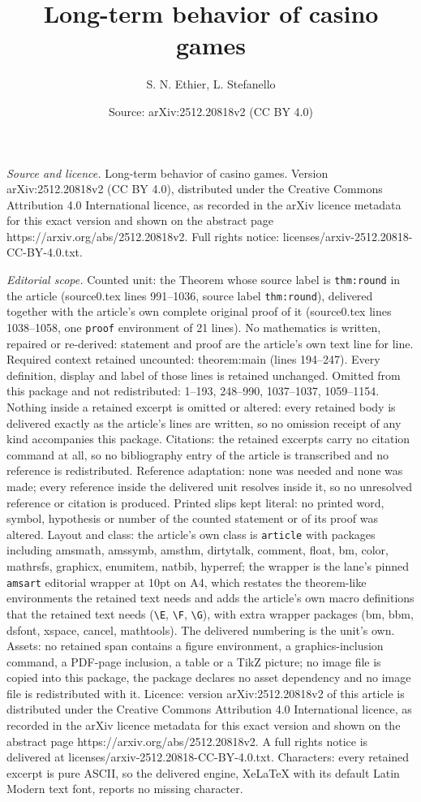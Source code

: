 \documentclass[10pt,a4paper]{amsart}
\title[Long-term behavior of casino games]{Long-term behavior of casino games}
\author{S. N. Ethier, L. Stefanello}
\date{Source: arXiv:2512.20818v2 (CC BY 4.0)}
\begin{document}
\maketitle

\noindent\emph{Source and licence.} Long-term behavior of casino games. Version arXiv:2512.20818v2 (CC BY 4.0), distributed under the Creative Commons Attribution 4.0 International licence, as recorded in the arXiv licence metadata for this exact version and shown on the abstract page https://arxiv.org/abs/2512.20818v2. Full rights notice: licenses/arxiv-2512.20818-CC-BY-4.0.txt.\par\smallskip

\noindent\textit{Editorial scope.} Counted unit: the Theorem whose source label is \texttt{thm:round} in the article (source0.tex lines 991--1036, source label \texttt{thm:round}), delivered together with the article's own complete original proof of it (source0.tex lines 1038--1058, one \texttt{proof} environment of 21 lines). No mathematics is written, repaired or re-derived: statement and proof are the article's own text line for line. Required context retained uncounted: theorem:main (lines 194--247). Every definition, display and label of those lines is retained unchanged. Omitted from this package and not redistributed: 1--193, 248--990, 1037--1037, 1059--1154. Nothing inside a retained excerpt is omitted or altered: every retained body is delivered exactly as the article's lines are written, so no omission receipt of any kind accompanies this package. Citations: the retained excerpts carry no citation command at all, so no bibliography entry of the article is transcribed and no reference is redistributed. Reference adaptation: none was needed and none was made; every reference inside the delivered unit resolves inside it, so no unresolved reference or citation is produced. Printed slips kept literal: no printed word, symbol, hypothesis or number of the counted statement or of its proof was altered. Layout and class: the article's own class is \texttt{article} with packages including amsmath, amssymb, amsthm, dirtytalk, comment, float, bm, color, mathrsfs, graphicx, enumitem, natbib, hyperref; the wrapper is the lane's pinned \texttt{amsart} editorial wrapper at 10pt on A4, which restates the theorem-like environments the retained text needs and adds the article's own macro definitions that the retained text needs (\texttt{\textbackslash E}, \texttt{\textbackslash F}, \texttt{\textbackslash G}), with extra wrapper packages (bm, bbm, dsfont, xspace, cancel, mathtools). The delivered numbering is the unit's own. Assets: no retained span contains a figure environment, a graphics-inclusion command, a PDF-page inclusion, a table or a TikZ picture; no image file is copied into this package, the package declares no asset dependency and no image file is redistributed with it. Licence: version arXiv:2512.20818v2 of this article is distributed under the Creative Commons Attribution 4.0 International licence, as recorded in the arXiv licence metadata for this exact version and shown on the abstract page https://arxiv.org/abs/2512.20818v2. A full rights notice is delivered at licenses/arxiv-2512.20818-CC-BY-4.0.txt. Characters: every retained excerpt is pure ASCII, so the delivered engine, XeLaTeX with its default Latin Modern text font, reports no missing character.
\end{document}

